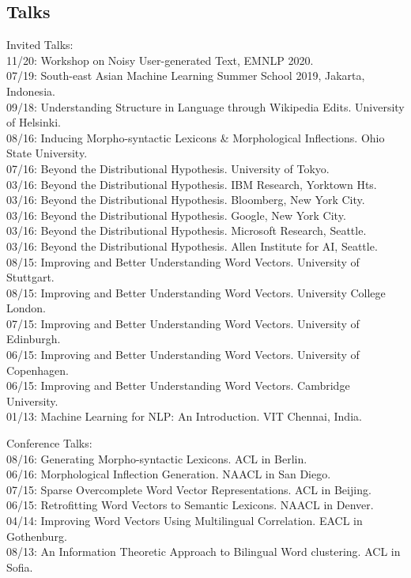 \documentclass[margin,line]{res}
\begin{document}
\begin{resume}
\section{\sc Talks}
\begin{hangparas}{.25in}{1}

Invited Talks:\\
11/20: Workshop on Noisy User-generated Text, EMNLP 2020.\\
07/19: South-east Asian Machine Learning Summer School 2019, Jakarta, Indonesia.\\
09/18: Understanding Structure in Language through Wikipedia Edits. University of Helsinki.\\
08/16: Inducing Morpho-syntactic Lexicons \& Morphological Inflections. Ohio State University.\\
07/16: Beyond the Distributional Hypothesis. University of Tokyo.\\
03/16: Beyond the Distributional Hypothesis. IBM Research, Yorktown Hts.\\
03/16: Beyond the Distributional Hypothesis. Bloomberg, New York City.\\
03/16: Beyond the Distributional Hypothesis. Google, New York City.\\
03/16: Beyond the Distributional Hypothesis. Microsoft Research, Seattle.\\
03/16: Beyond the Distributional Hypothesis. Allen Institute for AI, Seattle.\\
08/15: Improving and Better Understanding Word Vectors. University of Stuttgart.\\
08/15: Improving and Better Understanding Word Vectors. University College London.\\
07/15: Improving and Better Understanding Word Vectors. University of Edinburgh.\\
06/15: Improving and Better Understanding Word Vectors. University of Copenhagen.\\
06/15: Improving and Better Understanding Word Vectors. Cambridge University.\\
01/13: Machine Learning for NLP: An Introduction. VIT Chennai, India.

Conference Talks:\\
08/16: Generating Morpho-syntactic Lexicons. ACL in Berlin.\\
06/16: Morphological Inflection Generation. NAACL in San Diego.\\
07/15: Sparse Overcomplete Word Vector Representations. ACL in Beijing.\\
06/15: Retrofitting Word Vectors to Semantic Lexicons. NAACL in Denver.\\
04/14: Improving Word Vectors Using Multilingual Correlation. EACL in Gothenburg.\\
08/13: An Information Theoretic Approach to Bilingual Word clustering. ACL in Sofia.



\end{hangparas}
\end{resume}
\end{document}
